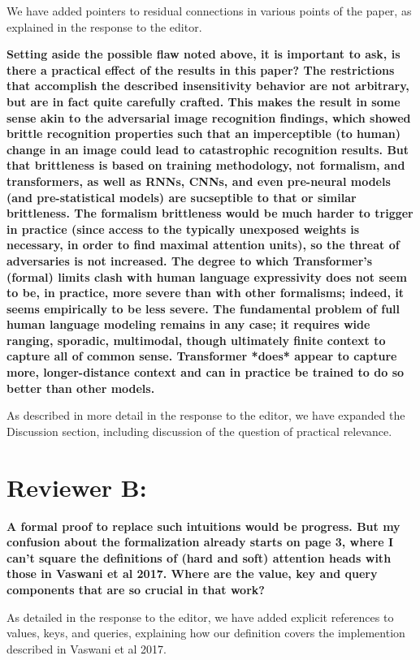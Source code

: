 \documentclass[11pt,a4paper]{article}
\newcommand\response[1]{{\color{blue}#1}}
\newcommand\original[1]{\textbf{#1}}
\begin{document}
\response{We have added pointers to residual connections in various points of the paper, as explained in the response to the editor. }


\original{Setting aside the possible flaw noted above, it is important to ask, is
there a practical effect of the results in this paper? The
restrictions that accomplish the described insensitivity behavior are
not arbitrary, but are in fact quite carefully crafted. This makes the
result in some sense akin to the adversarial image recognition
findings, which showed brittle recognition properties such that an
imperceptible (to human) change in an image could lead to
catastrophic recognition results. But that brittleness is based on
training methodology, not formalism, and transformers, as well as
RNNs, CNNs, and even pre-neural models (and pre-statistical models)
are sucseptible to that or similar brittleness. The formalism
brittleness would be much harder to trigger in practice (since access
to the typically unexposed weights is necessary, in order to find
maximal attention units), so the threat
of adversaries is not increased. The degree to which Transformer's
(formal) limits clash with human language expressivity does not seem
to be, in practice, more severe than with other formalisms; indeed, it
seems empirically to be less severe. The fundamental problem of full
human language modeling remains in any case; it requires wide ranging,
sporadic, multimodal, though ultimately finite context to capture all
of common sense. Transformer *does* appear to capture more,
longer-distance context and can in practice be trained to do so better
than other models.}

\response{As described in more detail in the response to the editor, we have expanded the Discussion section, including discussion of the question of practical relevance.}

\section{Reviewer B:}


\original{A formal proof to replace such intuitions would be progress. But my
confusion about the formalization already starts on page 3, where I can’t
square the definitions of (hard and soft) attention heads with those in
Vaswani et al 2017. Where are the value, key and query components that are
so crucial in that work?}

\response{As detailed in the response to the editor, we have added explicit references to values, keys, and queries, explaining how our definition covers the implemention described in Vaswani et al 2017.}
\end{document}
